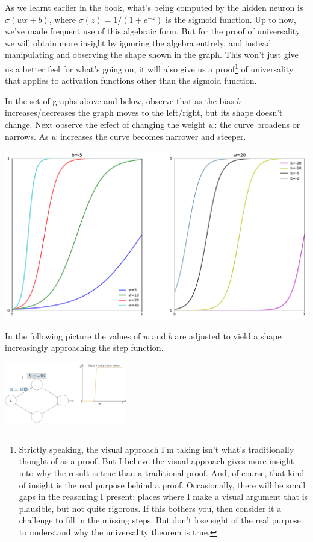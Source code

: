 As we learnt earlier in the book, what's being computed by the hidden neuron is $\sigma (wx+b)$, where $\sigma(z)=1/(1+e^{-z})$ is the sigmoid function. Up to now, we've made frequent use of this algebraic form. But for the proof of universality we will obtain more insight by ignoring the algebra entirely, and instead manipulating and observing the shape shown in the graph. This won't just give us a better feel for what's going on, it will also give us a proof\footnote{Strictly speaking, the visual approach I'm taking isn't what's traditionally thought of as a proof. But I believe the visual approach gives more insight into why the result is true than a traditional proof. And, of course, that kind of insight is the real purpose behind a proof. Occasionally, there will be small gaps in the reasoning I present: places where I make a visual argument that is plausible, but not quite rigorous. If this bothers you, then consider it a challenge to fill in the missing steps. But don't lose sight of the real purpose: to understand why the universality theorem is true.} of universality that applies to activation functions other than the sigmoid function.

In the set of graphs above and below, observe  that as the bias $b$ increases/decreases the graph moves to the left/right, but its shape doesn't change.
Next observe the effect of changing the weight $w$: the curve broadens or narrows. As $w$ increases the curve becomes narrower and steeper.

{\centering \includegraphics[width=\textwidth,]{eps/sigmoid1x2plot} \par}

In the following picture the values of $w$ and $b$ are adjusted to yield a shape increasingly approaching the step function.
{\centering \includegraphics[width=0.4\textwidth,]{pic/wigglyfn08.png} \par}


